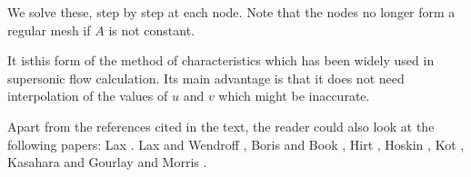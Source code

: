 We solve these, step by step at each node. Note that the nodes no longer form a regular mesh if $A$ is not constant. 

It is\pageoriginale this form of the method of characteristics which has been widely used in supersonic flow calculation. Its main advantage is that it does not need interpolation of the values of $u$ and $v$ which might be inaccurate.

\medskip
{} Apart from the references cited in
the text, the reader could also look at the following papers: Lax
\cite{key21}. Lax and Wendroff \cite{key23, key24}, Boris and Book
\cite{key4}, Hirt \cite{key15}, Hoskin \cite{key16}, Kot \cite{key18},
Kasahara \cite{key17} and Gourlay and Morris \cite{key13}.
